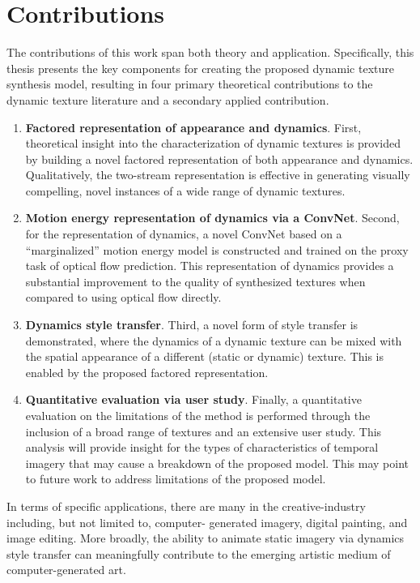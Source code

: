 \section{Contributions}

The contributions of this work span both theory and application. Specifically, this thesis presents the key components for creating the proposed dynamic texture synthesis model, resulting in four primary theoretical contributions to the dynamic texture literature and a secondary applied contribution.

\begin{enumerate}
	\item \textbf{Factored representation of appearance and dynamics}. First, theoretical insight into the characterization of dynamic textures is provided by building a novel factored representation of both appearance and dynamics. Qualitatively, the two-stream representation is effective in generating visually compelling, novel instances of a wide range of dynamic textures.
	\item \textbf{Motion energy representation of dynamics via a ConvNet}. Second, for the representation of dynamics, a novel ConvNet based on a ``marginalized'' motion energy model \cite{derpanis2010role,derpanis2012spacetime} is constructed and trained on the proxy task of optical flow prediction. This representation of dynamics provides a substantial improvement to the quality of synthesized textures when compared to using optical flow directly.
	\item \textbf{Dynamics style transfer}. Third, a novel form of style transfer is demonstrated, where the dynamics of a dynamic texture can be mixed with the spatial appearance of a different (static or dynamic) texture. This is enabled by the proposed factored representation.
	\item \textbf{Quantitative evaluation via user study}. Finally, a quantitative evaluation on the limitations of the method is performed through the inclusion of a broad range of textures and an extensive user study. This analysis will provide insight for the types of characteristics of temporal imagery that may cause a breakdown of the proposed model. This may point to future work to address limitations of the proposed model.
\end{enumerate}

In terms of specific applications, 
there are many in the creative-industry including, but not limited to, computer-
generated imagery, digital painting, and image editing. More broadly, the ability 
to animate static imagery via dynamics style transfer can meaningfully contribute 
to the emerging artistic medium of computer-generated art.